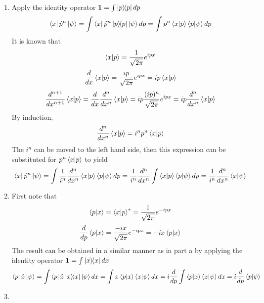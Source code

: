 \begin{sol}
\begin{enumerate}[label=\textbf{(\alph*)}]
\item
Apply the identity operator $\mathbf{1}=\int\ketbra{p}{p}dp$ 
\begin{equation}
	\bra x\hat p^n\ket\psi=\int\bra x\hat p^n\ketbra{p}{p}\ket\psi dp=\int p^n\braket{x}{p}\braket{p}{\psi}dp
\end{equation}  It is known that 
\begin{equation}
	\braket{x}{p}=\frac{1}{\sqrt{2\pi}}e^{ipx}
\end{equation}
\begin{equation}
	\frac{d}{dx}\braket{x}{p}=\frac{ip}{\sqrt{2\pi}}e^{ipx}=ip\braket{x}{p}
\end{equation} 
\begin{equation}
	\frac{d^{n+1}}{dx^{n+1}}\braket{x}{p}=\frac{d}{dx}\frac{d^n}{dx^n}\braket{x}{p}=ip\frac{(ip)^n}{\sqrt{2\pi}}e^{ipx}=ip\frac{d^n}{dx^n}\braket{x}{p}
\end{equation} 
By induction,\begin{equation}
	\frac{d^n}{dx^n}\braket{x}{p}=i^np^n\braket{x}{p}
\end{equation} 
The $i^n$ can be moved to the left hand side, then this expression can be substituted for $p^n\braket{x}{p}$ to yield
\begin{equation}
	\bra x\hat p^n\ket\psi=\int \frac{1}{i^n}\frac{d^n}{dx^n}\braket{x}{p}\braket{p}{\psi}dp=\frac{1}{i^n}\frac{d^n}{dx^n}\int \braket{x}{p}\braket{p}{\psi}dp=\frac{1}{i^n}\frac{d^n}{dx^n}\braket{x}{\psi}
\end{equation} \item
First note that
\begin{equation}
	\braket{p}{x}=\braket{x}{p}^*=\frac{1}{\sqrt{2\pi}}e^{-ipx}
\end{equation}
\begin{equation}
	\frac{d}{dp}\braket{p}{x}=\frac{-ix}{\sqrt{2\pi}}e^{-ipx}=-ix\braket{p}{x}
\end{equation}
The result can be obtained in a similar manner as in part a by applying the identity operator $\mathbf{1}=\int\ketbra{x}{x}dx$ 
\begin{equation}
	 \bra p\hat x\ket\psi=\int \bra p\hat x\ketbra {x}{x}\ket\psi dx=\int x\braket{p}{x}\braket{x}{\psi}dx=i\frac{d}{dp}\int \braket{p}{x}\braket{x}{\psi}dx=i\frac{d}{dp}\braket{p}{\psi}
\end{equation} 
\item
\begin{equation}

\end{equation}
\end{enumerate}
\end{sol}
